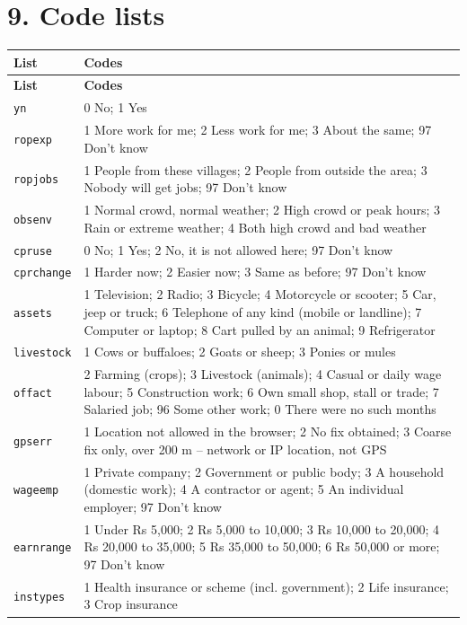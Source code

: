 \documentclass[10pt]{article}
\begin{document}
\section*{9. Code lists}
{\scriptsize
\begin{longtable}{p{2cm}p{14cm}}
\toprule
\textbf{List} & \textbf{Codes} \\
\midrule
\endfirsthead
\toprule
\textbf{List} & \textbf{Codes} \\
\midrule
\endhead
\texttt{yn} & 0 No; 1 Yes \\
\texttt{ropexp} & 1 More work for me; 2 Less work for me; 3 About the same; 97 Don't know \\
\texttt{ropjobs} & 1 People from these villages; 2 People from outside the area; 3 Nobody will get jobs; 97 Don't know \\
\texttt{obsenv} & 1 Normal crowd, normal weather; 2 High crowd or peak hours; 3 Rain or extreme weather; 4 Both high crowd and bad weather \\
\texttt{cpruse} & 0 No; 1 Yes; 2 No, it is not allowed here; 97 Don't know \\
\texttt{cprchange} & 1 Harder now; 2 Easier now; 3 Same as before; 97 Don't know \\
\texttt{assets} & 1 Television; 2 Radio; 3 Bicycle; 4 Motorcycle or scooter; 5 Car, jeep or truck; 6 Telephone of any kind (mobile or landline); 7 Computer or laptop; 8 Cart pulled by an animal; 9 Refrigerator \\
\texttt{livestock} & 1 Cows or buffaloes; 2 Goats or sheep; 3 Ponies or mules \\
\texttt{offact} & 2 Farming (crops); 3 Livestock (animals); 4 Casual or daily wage labour; 5 Construction work; 6 Own small shop, stall or trade; 7 Salaried job; 96 Some other work; 0 There were no such months \\
\texttt{gpserr} & 1 Location not allowed in the browser; 2 No fix obtained; 3 Coarse fix only, over 200 m -- network or IP location, not GPS \\
\texttt{wageemp} & 1 Private company; 2 Government or public body; 3 A household (domestic work); 4 A contractor or agent; 5 An individual employer; 97 Don't know \\
\texttt{earnrange} & 1 Under Rs 5,000; 2 Rs 5,000 to 10,000; 3 Rs 10,000 to 20,000; 4 Rs 20,000 to 35,000; 5 Rs 35,000 to 50,000; 6 Rs 50,000 or more; 97 Don't know \\
\texttt{instypes} & 1 Health insurance or scheme (incl. government); 2 Life insurance; 3 Crop insurance \\

\end{longtable}}
\end{document}
